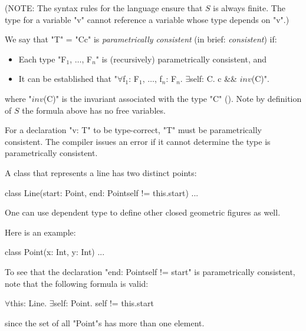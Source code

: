 (NOTE: The syntax rules for the language ensure that $S$ is always
finite. The type for a variable \xcd"v" cannot reference a variable whose
type depends on \xcd"v".)

We say that \xcd"T" = \xcd"C{c}" is {\em parametrically consistent} (in brief:
{\em consistent}) if:

\begin{itemize}
\item Each type \xcdmath"F$_1$, $\dots$, F$_n$" is (recursively) parametrically consistent, and
\item It can be established that
\xcdmath"$\forall$f$_1$: F$_1$, $\dots$, f$_n$: F$_n$. $\exists$self: C. c && $\mathit{inv}$(C)".
\end{itemize}

\noindent
where \xcdmath"$\mathit{inv}$(C)" is the invariant associated
with the type \xcd"C" ().  Note by
definition of $S$ the formula above has no free variables.

\begin{staticrule*}
For a declaration \xcd"v: T" to be type-correct, \xcd"T" must be parametrically
consistent. The compiler issues an error if it cannot determine
the type is parametrically consistent.
\end{staticrule*}

\begin{example}

A class that represents a line has two distinct points:

\begin{xten}
class Line(start: Point, 
           end: Point{self != this.start}) {...}      
\end{xten}
\end{example}

One can use dependent type to define other closed geometric figures as well.

\begin{example}
Here is an example:
\begin{xten}
class Point(x: Int, y: Int) {...}
\end{xten}


To see that the declaration \xcd"end: Point{self != start}" is
parametrically consistent, note that the following formula is valid:
\begin{xtenmath}
$\forall$this: Line. $\exists$self: Point. self != this.start  
\end{xtenmath}
\noindent since the set of all \xcd"Point"s has more than one element.
\end{example}

